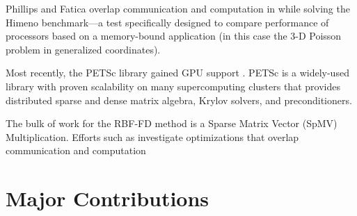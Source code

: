 \documentclass[11pt]{report}
\begin{document}

Phillips and Fatica overlap communication and computation in \cite{Phillips2010} while solving the Himeno benchmark---a test specifically designed to compare performance of processors based on a memory-bound application (in this case the 3-D Poisson problem in generalized coordinates).  


Most recently, the PETSc library gained GPU support \cite{Minden2010,YokotaGPU2010}. PETSc is a widely-used library with proven scalability on many supercomputing clusters that provides distributed sparse and dense matrix algebra, Krylov solvers, and preconditioners. 



The bulk of work for the RBF-FD method is a Sparse Matrix Vector (SpMV) Multiplication. Efforts such as \cite{Schubert2011,Kreutzer2012} investigate optimizations that overlap communication and computation 




\section{Major Contributions}
\end{document}
